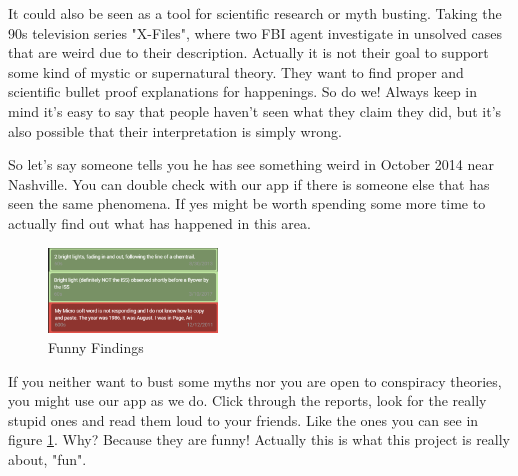 \documentclass{article}
\begin{document}
It could also be seen as a tool for scientific research or myth busting. Taking the 90s television series "X-Files", where two FBI agent investigate in unsolved cases that are weird due to their description. Actually it is not their goal to support some kind of mystic or supernatural theory.
They want to find proper and scientific bullet proof explanations for happenings. So do we! Always keep in mind it's easy to say that people haven't seen what they claim they did, but it's also possible that their interpretation is simply wrong.

So let's say someone tells you he has see something weird in October 2014 near Nashville. You can double check with our app
if there is someone else that has seen the same phenomena. If yes might be worth spending some more time to actually find out
what has happened in this area.\\

\begin{figure} 
    \centering
    \includegraphics[width=0.4\textwidth]{funnyFindings}
    \caption{Funny Findings}
    \label{fig:funnyFindings}
\end{figure}

If you neither want to bust some myths nor you are open to conspiracy theories, 
you might use our app as we do. Click through the reports, look for the really 
stupid ones and read them loud to your friends. Like the ones you can see in figure \ref{fig:funnyFindings}.
Why? Because they are funny! Actually this is what this project is really about, "fun".
\end{document}

